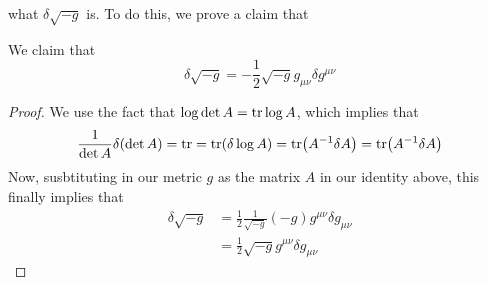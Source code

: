 what $ \delta \sqrt{ - g }   $  is. To do this, 
we prove a claim that 
\begin{claim}
	We claim that 
	\[
	 \delta \sqrt{ - g }   = - \frac{1}{2 } \sqrt{ - g }  g _{ \mu \nu } \delta g ^{ \mu \nu }
	\] 
\begin{proof}
	We use the fact that $ \log \det A = \tr \log A $, which implies 
	that 
	 \[
		 \frac{1}{\det  A } \delta ( \det  A)  = \tr  = \tr ( \delta \log A )  = \tr ( 
		 A^{ - 1} \delta A ) = \tr ( A ^{ - 1 } \delta A ) 
	 \] Now, susbtituting in our metric $ g $ as 
	 the matrix $ A $ in our identity above, this finally implies that 
	 \begin{align*}
		 \delta \sqrt{ - g} &  = \frac{1}{2 } \frac{1}{\sqrt{ - g}  } ( - g ) 
		 g ^{\mu \nu } \delta g_{ \mu \nu } \\
		 &=  \frac{1}{2 } \sqrt{ -g }  g ^{ \mu \nu } \delta g _{ \mu \nu } 
	 \end{align*} 
\end{proof}
\end{claim}

